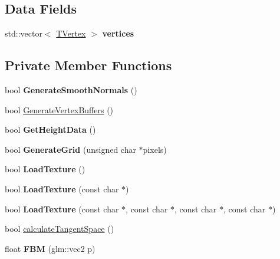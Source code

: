 \subsection*{Data Fields}
\begin{DoxyCompactItemize}
\item 
std\+::vector$<$ \hyperlink{struct_t_vertex}{T\+Vertex} $>$ {\bfseries vertices}\hypertarget{class_terrain_a88f96e1a232ab0988374c8dab5a4811b}{}\label{class_terrain_a88f96e1a232ab0988374c8dab5a4811b}

\end{DoxyCompactItemize}
\subsection*{Private Member Functions}
\begin{DoxyCompactItemize}
\item 
bool {\bfseries Generate\+Smooth\+Normals} ()\hypertarget{class_terrain_aff2d55c6ee9b121d7415a79200b73d19}{}\label{class_terrain_aff2d55c6ee9b121d7415a79200b73d19}

\item 
bool \hyperlink{class_terrain_a7e77d9afe77e6dd620bf75b5fe78d2e5}{Generate\+Vertex\+Buffers} ()
\item 
bool {\bfseries Get\+Height\+Data} ()\hypertarget{class_terrain_a55ebd220a1a01d21dd4eec91a0ba4720}{}\label{class_terrain_a55ebd220a1a01d21dd4eec91a0ba4720}

\item 
bool {\bfseries Generate\+Grid} (unsigned char $\ast$pixels)\hypertarget{class_terrain_a5c6eb848fa1940645c58a882d9aaef0b}{}\label{class_terrain_a5c6eb848fa1940645c58a882d9aaef0b}

\item 
bool {\bfseries Load\+Texture} ()\hypertarget{class_terrain_a16aea22e901e7bb2dce78010016892a6}{}\label{class_terrain_a16aea22e901e7bb2dce78010016892a6}

\item 
bool {\bfseries Load\+Texture} (const char $\ast$)\hypertarget{class_terrain_a01f32fb73f1ee8b218854faa642fca53}{}\label{class_terrain_a01f32fb73f1ee8b218854faa642fca53}

\item 
bool {\bfseries Load\+Texture} (const char $\ast$, const char $\ast$, const char $\ast$, const char $\ast$)\hypertarget{class_terrain_af8dee255be36a8d5f0843933e03c2664}{}\label{class_terrain_af8dee255be36a8d5f0843933e03c2664}

\item 
bool \hyperlink{class_terrain_a935fd7063c832bfb422a49edefa87329}{calculate\+Tangent\+Space} ()
\item 
float {\bfseries F\+BM} (glm\+::vec2 p)\hypertarget{class_terrain_aee1b41d570cc5347d7b73d70ad29f5d4}{}\label{class_terrain_aee1b41d570cc5347d7b73d70ad29f5d4}

\end{DoxyCompactItemize}
